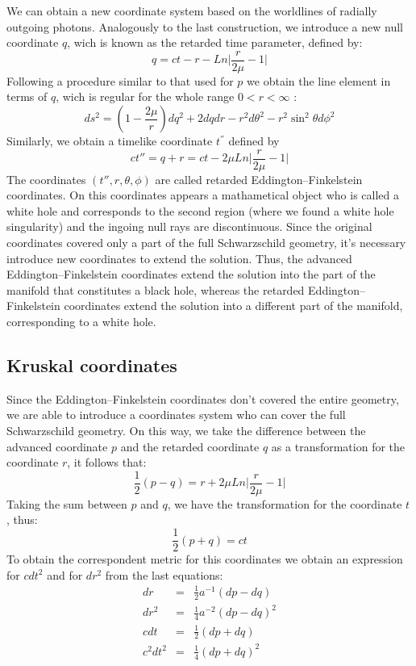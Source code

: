 \documentclass[letterpaper,11pt,onecolumn]{article}
\begin{document}
We can obtain a new coordinate system based on the worldlines of radially outgoing photons. Analogously to the last construction, we introduce a new null coordinate $q$, wich is known as the retarded time parameter, defined by:
\begin{equation}
    q= ct - r - Ln\Big| \frac{r}{2\mu}-1 \Big|\label{46}
\end{equation}
Following a procedure similar to that used for $p$ we obtain the line element in terms of $q$, wich is regular for the whole range $0<r<\infty$ :
\begin{equation}
ds^2 =\left( 1 - \frac{2\mu}{r}\right)dq^2+2dqdr- r^2 d\theta^2 - r^2 \sin^2 \theta d\phi^2 \label{5}
\end{equation}
Similarly, we obtain a timelike coordinate $t^{''}$ defined by
\begin{equation}
    ct''= q+r=ct-2\mu Ln\Big| \frac{r}{2\mu}-1 \Big|\label{6}
\end{equation}
The coordinates $(t'',r,\theta,\phi)$ are called retarded Eddington–Finkelstein coordinates. On this coordinates appears a mathametical object who is called a white hole and corresponds to the second region (where we found a white hole singularity) and the ingoing null rays are discontinuous. Since the original coordinates covered only a part of the full Schwarzschild geometry, it's necessary introduce new coordinates to extend the solution. Thus, the advanced Eddington–Finkelstein coordinates extend the solution into the part of the manifold that constitutes a black hole, whereas the retarded Eddington–Finkelstein coordinates extend the solution into a different part of the manifold, corresponding to a white hole. 

\subsection{Kruskal coordinates}
Since the Eddington–Finkelstein coordinates don't covered the entire geometry, we are able to introduce a coordinates system who can cover the full Schwarzschild geometry. On this way, we take the difference between the advanced coordinate $p$ and the retarded coordinate $q$ as a transformation for the coordinate $r$, it follows that:
\begin{equation*}
    \frac{1}{2}(p-q)=r+2\mu Ln\Big| \frac{r}{2\mu}-1 \Big|
\end{equation*}
Taking the sum between $p$ and $q$, we have the transformation for the coordinate $t$, thus:
\begin{equation*}
    \frac{1}{2}(p+q)=ct
\end{equation*}
To obtain the correspondent metric for this coordinates we obtain an expression for $cdt^2$ and for $dr^2$ from the last equations:
\begin{eqnarray*}
dr&=& \frac{1}{2}a^{-1}(dp-dq)\\
dr^2&=& \frac{1}{4}a^{-2}(dp-dq)^2\\
    cdt&=& \frac{1}{2}(dp+dq) \\
    c^{2}dt^{2}&=& \frac{1}{4}(dp+dq)^2
\end{eqnarray*}
\end{document}
